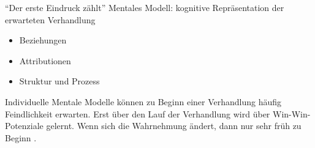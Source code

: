 
  

\begin{frame}{\enquote{Der erste Eindruck zählt}}
  Mentales Modell: kognitive Repräsentation der erwarteten Verhandlung \cite[][p. 287ff]{bazerman_negotiation_2000}
  \begin{itemize}
	\item Beziehungen
	\item Attributionen
	\item Struktur und Prozess
  \end{itemize}

  Individuelle Mentale Modelle können zu Beginn einer Verhandlung häufig Feindlichkeit erwarten.
  Erst über den Lauf der Verhandlung wird über Win-Win-Potenziale gelernt. Wenn sich die Wahrnehmung ändert, dann nur sehr früh zu Beginn \cite{thompson_social_1990}
    \cite[][p. 287ff]{bazerman_negotiation_2000}. 

\end{frame}



